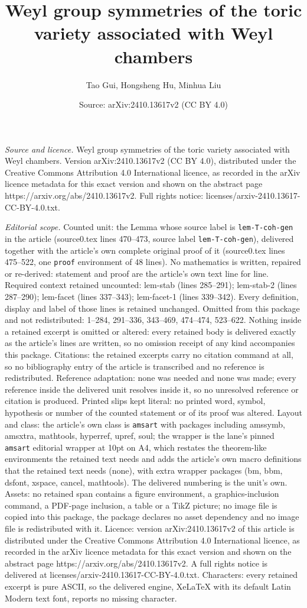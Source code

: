 \documentclass[10pt,a4paper]{amsart}
\title[Weyl group symmetries of the toric variety associated with W]{Weyl group symmetries of the toric variety associated with Weyl chambers}
\author{Tao Gui, Hongsheng Hu, Minhua Liu}
\date{Source: arXiv:2410.13617v2 (CC BY 4.0)}
\begin{document}
\maketitle

\noindent\emph{Source and licence.} Weyl group symmetries of the toric variety associated with Weyl chambers. Version arXiv:2410.13617v2 (CC BY 4.0), distributed under the Creative Commons Attribution 4.0 International licence, as recorded in the arXiv licence metadata for this exact version and shown on the abstract page https://arxiv.org/abs/2410.13617v2. Full rights notice: licenses/arxiv-2410.13617-CC-BY-4.0.txt.\par\smallskip

\noindent\textit{Editorial scope.} Counted unit: the Lemma whose source label is \texttt{lem-T-coh-gen} in the article (source0.tex lines 470--473, source label \texttt{lem-T-coh-gen}), delivered together with the article's own complete original proof of it (source0.tex lines 475--522, one \texttt{proof} environment of 48 lines). No mathematics is written, repaired or re-derived: statement and proof are the article's own text line for line. Required context retained uncounted: lem-stab (lines 285--291); lem-stab-2 (lines 287--290); lem-facet (lines 337--343); lem-facet-1 (lines 339--342). Every definition, display and label of those lines is retained unchanged. Omitted from this package and not redistributed: 1--284, 291--336, 343--469, 474--474, 523--622. Nothing inside a retained excerpt is omitted or altered: every retained body is delivered exactly as the article's lines are written, so no omission receipt of any kind accompanies this package. Citations: the retained excerpts carry no citation command at all, so no bibliography entry of the article is transcribed and no reference is redistributed. Reference adaptation: none was needed and none was made; every reference inside the delivered unit resolves inside it, so no unresolved reference or citation is produced. Printed slips kept literal: no printed word, symbol, hypothesis or number of the counted statement or of its proof was altered. Layout and class: the article's own class is \texttt{amsart} with packages including amssymb, amsxtra, mathtools, hyperref, upref, soul; the wrapper is the lane's pinned \texttt{amsart} editorial wrapper at 10pt on A4, which restates the theorem-like environments the retained text needs and adds the article's own macro definitions that the retained text needs (none), with extra wrapper packages (bm, bbm, dsfont, xspace, cancel, mathtools). The delivered numbering is the unit's own. Assets: no retained span contains a figure environment, a graphics-inclusion command, a PDF-page inclusion, a table or a TikZ picture; no image file is copied into this package, the package declares no asset dependency and no image file is redistributed with it. Licence: version arXiv:2410.13617v2 of this article is distributed under the Creative Commons Attribution 4.0 International licence, as recorded in the arXiv licence metadata for this exact version and shown on the abstract page https://arxiv.org/abs/2410.13617v2. A full rights notice is delivered at licenses/arxiv-2410.13617-CC-BY-4.0.txt. Characters: every retained excerpt is pure ASCII, so the delivered engine, XeLaTeX with its default Latin Modern text font, reports no missing character.
\end{document}
